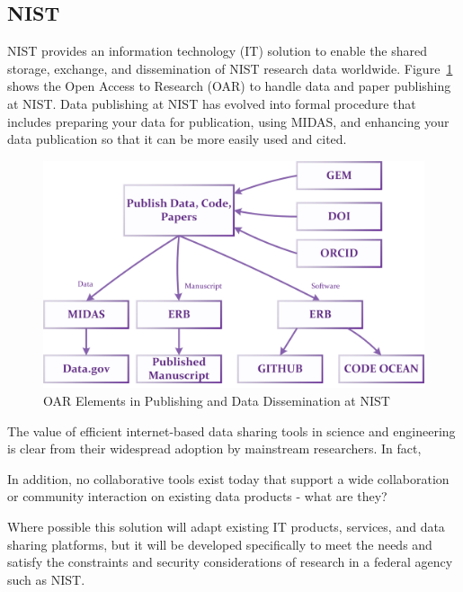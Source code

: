 \subsection{NIST}
NIST provides an information technology (IT) solution to enable the shared storage, exchange, and dissemination of NIST research data worldwide.  Figure~\ref{fg:oar_arch} shows the  Open Access to Research (OAR)  to handle data and paper publishing at NIST.  Data publishing at NIST has evolved into formal procedure that includes preparing your data for publication, using MIDAS, and enhancing your data publication so that it can be more easily used and cited.  

\begin{figure}[!h]
\centering
\includegraphics*[width=0.9\columnwidth]{./Figure/Publishing_AI_Elements.jpg}
\caption{OAR Elements in Publishing and Data Dissemination at NIST}
\label{fg:oar_arch} 
\end{figure}

The value of efficient internet-based data sharing tools in science and engineering is clear from their
widespread adoption by mainstream researchers. In fact, 

In addition, no collaborative tools exist today that support a wide collaboration or community interaction on existing data products - what are they?

Where possible this solution will adapt existing IT products, services, and data sharing platforms, but it
will be developed specifically to meet the needs and satisfy the constraints and security considerations of
research in a federal agency such as NIST.







